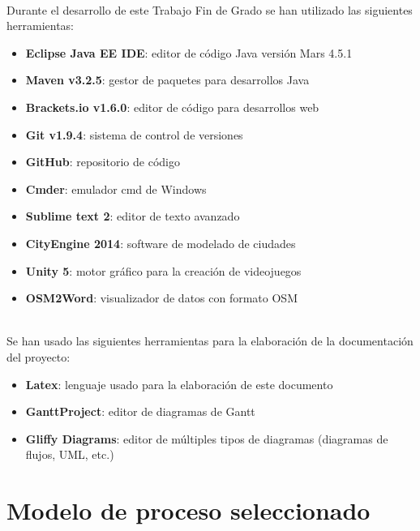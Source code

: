 \newpage       
{}\\

Durante el desarrollo de este Trabajo Fin de Grado se han utilizado las siguientes herramientas:

\begin{itemize}
       \item {\bfseries Eclipse Java EE IDE}: editor de código Java versión Mars 4.5.1
       \item {\bfseries Maven v3.2.5}: gestor de paquetes para desarrollos Java
       \item {\bfseries Brackets.io v1.6.0}: editor de código para desarrollos web
       \item {\bfseries Git v1.9.4}: sistema de control de versiones
       \item {\bfseries GitHub}: repositorio de código
       \item {\bfseries Cmder}: emulador cmd de Windows 
       \item {\bfseries Sublime text 2}: editor de texto avanzado
       \item {\bfseries CityEngine 2014}: software de modelado de ciudades
       \item {\bfseries Unity 5}: motor gráfico para la creación de videojuegos
       \item {\bfseries OSM2Word}: visualizador de datos con formato OSM
\end{itemize}

\\

Se han usado las siguientes herramientas para la elaboración de la documentación del proyecto:

\begin{itemize}
       \item {\bfseries Latex}: lenguaje usado para la elaboración de este documento
       \item {\bfseries GanttProject}: editor de diagramas de Gantt
       \item {\bfseries Gliffy Diagrams}: editor de múltiples tipos de diagramas (diagramas de flujos, UML, etc.)
\end{itemize}


\section{Modelo de proceso seleccionado}

